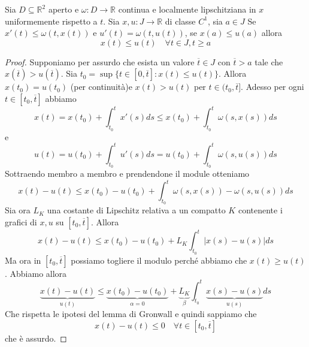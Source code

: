 \begin{theorem}
    Sia \(D \subseteq \mathbb{R}^2 \) aperto e \(\omega : D \to \mathbb{R}\)
    continua e localmente lipschitziana in \(x\) uniformemente rispetto a \(t\).
    Sia \(x, u : J \to \mathbb{R}\) di classe \(C^{1}\), sia \(a \in J\) 
        Se \(x'(t) \le \omega(t, x(t))\) e \(u'(t) = \omega(t, u(t))\), se
        \(x(a) \le u(a)\) allora
        \[
            x(t) \le u(t) \quad \forall t \in J, t \ge a
        \]
\end{theorem}
\begin{proof}
    Supponiamo per assurdo che esista un valore \(\overline{t} \in J\) con
    \(\overline{t} > a\) tale che \(x(\overline{t})> u(\overline{t})\).
    Sia \(t_{0} = \sup \{t \in [0, \overline{t}] : x(t) \le u(t)\} \). Allora
    \(x(t_{0}) = u(t_{0})\) (per continuità)e \(x(t) > u(t)\) per \(t \in
    (t_{0}, \overline{t}]\).
    Adesso per ogni \(t \in [t_{0}, \overline{t}]\) abbiamo
    \[
        x(t) = x(t_{0}) + \int_{t_{0}}^{t} x'(s) ds \le x(t_{0}) +
        \int_{t_{0}}^{t} \omega(s, x(s)) ds
    \]
    e
    \[
        u(t) = u(t_{0}) + \int_{t_{0}}^{t} u'(s) ds = u(t_{0}) + \int_{t_{0}}^{t}
        \omega(s, u(s)) ds
    \]
    Sottraendo membro a membro e prendendone il module otteniamo
    \[
        x(t) - u(t) \le x(t_{0}) - u(t_{0}) + \int_{t_{0}}^{t} \omega(s, x(s)) - \omega(s, u(s)) ds
    \]
    Sia ora \(L_K\) una costante di Lipschitz relativa a un compatto \(K\)
    contenente i grafici di \(x, u\) su \([t_{0}, \overline{t}]\). Allora
    \[
        x(t) - u(t) \le x(t_{0}) - u(t_{0}) + L_K \int_{t_{0}}^{t} |x(s) -
        u(s)| ds
    \]
    Ma ora in \([t_{0}, \overline{t}]\) possiamo togliere il modulo perché
    abbiamo che \(x(t) \ge u(t)\). Abbiamo allora
    \[
        \underbrace{x(t) - u(t)}_{u(t)} \le \underbrace{x(t_{0}) -
        u(t_{0})}_{\alpha=0} + \underbrace{L_K}_\beta \int_{t_{0}}^{t}
        \underbrace{x(s) - u(s)}_{u(s)} ds
    \]
    Che rispetta le ipotesi del lemma di Gronwall e quindi sappiamo che
    \[
        x(t) - u(t) \le 0 \quad \forall t \in [t_{0}, \overline{t}]
    \]
    che è assurdo.
\end{proof}


